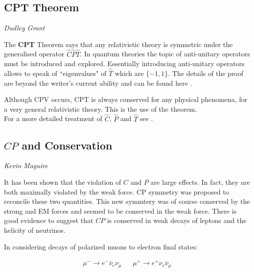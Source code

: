 \subsection{CPT Theorem}
\vspace{-1.0em}
\begin{center}
\tiny{\textit{Dudley Grant}}
\end{center}

The \textbf{CPT} Theorem says that any relativistic theory is symmetric under the generalised operator $\hat{C}\hat{P}\hat{T}$. In quantum theories the topic of anti-unitary operators must be introduced and explored. Essentially introducing anti-unitary operators allows to speak of ``eigenvalues" of $\hat{T}$ which are $\{-1,1\}$. The details of the proof are beyond the writer's current ability and can be found here \cite{CPT}.

Although CPV occurs, CPT is always conserved for any physical phenomena, for a very general relativistic theory. This is the use of the theorem.\\

For a more detailed treatment of $\hat{C}$, $\hat{P}$ and $\hat{T}$ see \cite{Martin+Shaw}.

\subsection{$CP$ and Conservation}
\vspace{-1.0em}
\begin{center}
\tiny{\textit{Kevin Maguire}}
\end{center}

It has been shown that the violation of $C$ and $P$ are large effects. In fact, they are both maximally violated by the weak force. CP symmetry was proposed to reconcile these two quantities. This new symmtery was of course conserved by the strong and EM forces and seemed to be conserved in the weak force. There is good evidence to suggest that $CP$ is conserved in weak decays of leptons and the helicity of neutrinos.

In considering decays of polarized muons to electron final states:

\begin{align*}
\mu^{-} \rightarrow e^{-} \bar{\nu}_{e} \nu_{\mu} & & \mu^{+} \rightarrow e^{+} \nu_{e} \bar{\nu}_{\mu} \\ 
\end{align*}

